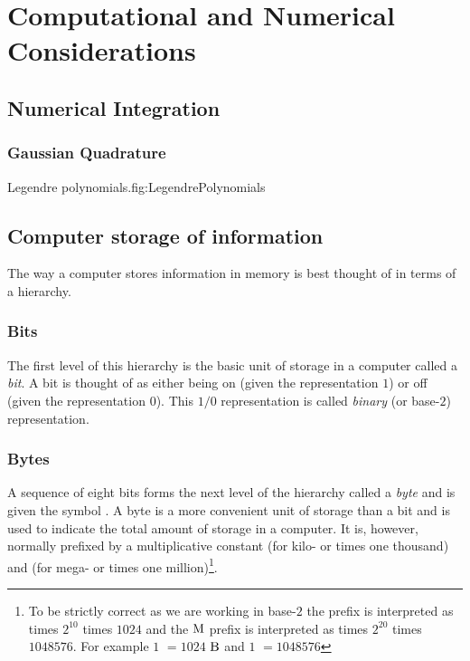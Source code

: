 \chapter{Computational and Numerical Considerations}
\label{cha:ComputationAndNumerics}

\section{Numerical Integration}

\subsection{Gaussian Quadrature}

{Legendre polynomials.}{fig:LegendrePolynomials}

\section{Computer storage of information}

The way a computer stores information in memory is best thought of in terms of
a hierarchy.

\subsection{Bits}

The first level of this hierarchy is the basic unit of storage in a computer
called a \emph{bit}. A bit is thought of as either being on (given the
representation $1$) or off (given the representation $0$). This $1/0$
representation is called \emph{binary} (or base-$2$) representation.

\subsection{Bytes}

A sequence of eight bits forms the next level of the hierarchy called
a \emph{byte} and is given the symbol \Byte. A byte is a more
convenient unit of storage than a bit and is used to indicate the
total amount of storage in a computer. It is, however, normally
prefixed by a multiplicative constant \eg {} (for kilo- or
times one thousand) and  (for mega- or times one
million)\footnote{To be strictly correct as we are working in base-$2$
the  prefix is interpreted as times $2^{10}$ \ie times $1024$
and the $\mathrm{M}$ prefix is interpreted as times $2^{20}$ \ie times
$1048576$. For example $1$ \kB $= 1024$ $\mathrm{B}$ and $1$ \MB
$=1048576$ \Byte}.

